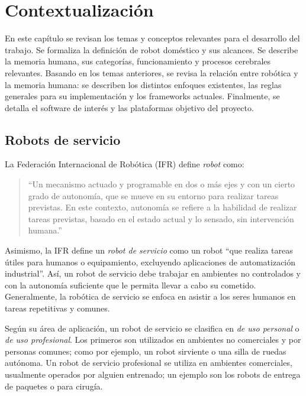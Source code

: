 
\chapter{Contextualización}\label{chapter:context}

En este capítulo se revisan los temas y conceptos relevantes para el desarrollo del trabajo. Se formaliza la definición de robot doméstico y sus alcances. Se describe la memoria humana, sus categorías, funcionamiento y procesos cerebrales relevantes. Basando en los temas anteriores, se revisa la relación entre robótica y la memoria humana: se describen los distintos enfoques existentes, las reglas generales para su implementación y los frameworks actuales. Finalmente, se detalla el software de interés y las plataformas objetivo del proyecto.


\section{Robots de servicio}

La Federación Internacional de Robótica (IFR)\cite{IFR} define \textit{robot} como:
\begin{quotation}
``Un mecanismo actuado y programable en dos o más ejes y con un cierto grado de autonomía, que se mueve en su entorno para realizar tareas previstas. En este contexto, autonomía se refiere a la habilidad de realizar tareas previstas, basado en el estado actual y lo sensado, sin intervención humana.''
\end{quotation}

Asimismo, la IFR define un \textit{robot de servicio} como un robot ``que realiza tareas útiles para humanos o equipamiento, excluyendo aplicaciones de automatización industrial''. Así, un robot de servicio debe trabajar en ambientes no controlados y con la autonomía suficiente que le permita llevar a cabo su cometido. Generalmente, la robótica de servicio se enfoca en asistir a los seres humanos en tareas repetitivas y comunes.

Según su área de aplicación, un robot de servicio se clasifica en \textit{de uso personal} o \textit{de uso profesional}. Los primeros son utilizados en ambientes no comerciales y por personas comunes; como por ejemplo, un robot sirviente o una silla de ruedas autónoma. Un robot de servicio profesional se utiliza en ambientes comerciales, usualmente operados por alguien entrenado; un ejemplo son los robots de entrega de paquetes o para cirugía.


